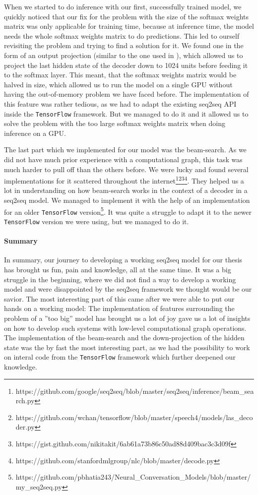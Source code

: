 When we started to do inference with our first, successfully trained model, we quickly noticed that our fix for the problem with the size of the softmax weights matrix was only applicable for training time, because at inference time, the model needs the whole softmax weights matrix to do predictions. This led to ourself revisiting the problem and trying to find a solution for it. We found one in the form of an output projection (similar to the one used in \cite{Vinyals:2015}), which allowed us to project the last hidden state of the decoder down to 1024 units before feeding it to the softmax layer. This meant, that the softmax weights matrix would be halved in size, which allowed us to run the model on a single GPU without having the out-of-memory problem we have faced before. The implementation of this feature was rather tedious, as we had to adapt the existing seq2seq API inside the \texttt{TensorFlow} framework. But we managed to do it and it allowed us to solve the problem with the too large softmax weights matrix when doing inference on a GPU.

The last part which we implemented for our model was the beam-search. As we did not have much prior experience with a computational graph, this task was much harder to pull off than the others before. We were lucky and found several implementations for it scattered throughout the internet\footnote{https://github.com/google/seq2seq/blob/master/seq2seq/inference/beam\_search.py}\footnote{https://github.com/wchan/tensorflow/blob/master/speech4/models/las\_decoder.py}\footnote{https://gist.github.com/nikitakit/6ab61a73b86c50ad88d409bac3c3d09f}\footnote{https://github.com/stanfordmlgroup/nlc/blob/master/decode.py}. They helped us a lot in understanding on how beam-search works in the context of a decoder in a seq2seq model. We managed to implement it with the help of an implementation for an older \texttt{TensorFlow} version\footnote{https://github.com/pbhatia243/Neural\_Conversation\_Models/blob/master/my\_seq2seq.py}. It was quite a struggle to adapt it to the newer \texttt{TensorFlow} version we were using, but we managed to do it.

\paragraph{Summary} In summary, our journey to developing a working seq2seq model for our thesis has brought us fun, pain and knowledge, all at the same time. It was a big struggle in the beginning, where we did not find a way to develop a working model and were disappointed by the seq2seq framework we thought would be our savior. The most interesting part of this came after we were able to put our hands on a working model: The implementation of features surrounding the problem of a ''too big'' model has brought us a lot of joy gave us a lot of insights on how to develop such systems with low-level computational graph operations. The implementation of the beam-search and the down-projection of the hidden state was the by fast the most interesting part, as we had the possibility to work on interal code from the \texttt{TensorFlow} framework which further deepened our knowledge.

